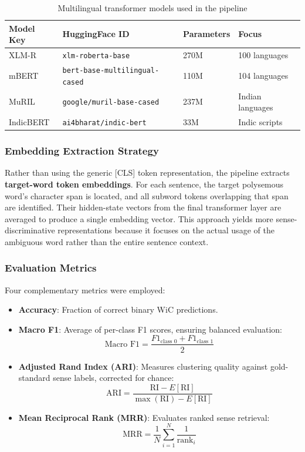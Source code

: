 \documentclass[12pt,a4paper,oneside]{article}
\begin{document}
\begin{table}[H]
\centering
\caption{Multilingual transformer models used in the pipeline}
\label{tab:models}
\begin{tabular}{l l l l}
\toprule
\textbf{Model Key} & \textbf{HuggingFace ID} & \textbf{Parameters} & \textbf{Focus} \\
\midrule
XLM-R & \texttt{xlm-roberta-base} & 270M & 100 languages \\
mBERT & \texttt{bert-base-multilingual-cased} & 110M & 104 languages \\
MuRIL & \texttt{google/muril-base-cased} & 237M & Indian languages \\
IndicBERT & \texttt{ai4bharat/indic-bert} & 33M & Indic scripts \\
\bottomrule
\end{tabular}
\end{table}

\subsubsection{Embedding Extraction Strategy}

Rather than using the generic [CLS] token representation, the pipeline extracts \textbf{target-word token embeddings}. For each sentence, the target polysemous word's character span is located, and all subword tokens overlapping that span are identified. Their hidden-state vectors from the final transformer layer are averaged to produce a single embedding vector. This approach yields more sense-discriminative representations because it focuses on the actual usage of the ambiguous word rather than the entire sentence context.

\subsubsection{Evaluation Metrics}

Four complementary metrics were employed:

\begin{itemize}[leftmargin=*]
  \item \textbf{Accuracy}: Fraction of correct binary WiC predictions.
  \item \textbf{Macro F1}: Average of per-class F1 scores, ensuring balanced evaluation:
  $$ \text{Macro F1} = \frac{F1_{\text{class 0}} + F1_{\text{class 1}}}{2} $$
  \item \textbf{Adjusted Rand Index (ARI)}: Measures clustering quality against gold-standard sense labels, corrected for chance:
  $$ \text{ARI} = \frac{\text{RI} - E[\text{RI}]}{\max(\text{RI}) - E[\text{RI}]} $$
  \item \textbf{Mean Reciprocal Rank (MRR)}: Evaluates ranked sense retrieval:
  $$ \text{MRR} = \frac{1}{N} \sum_{i=1}^{N} \frac{1}{\text{rank}_i} $$
\end{itemize}
\end{document}
